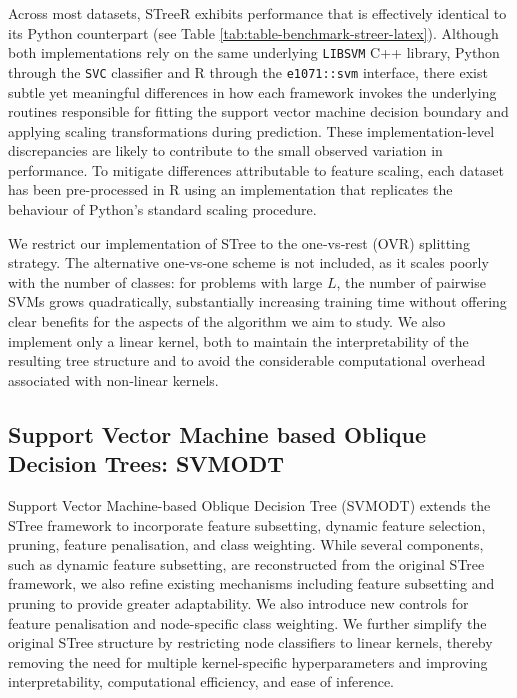 Across most datasets, STreeR exhibits performance that is effectively identical to its Python counterpart (see Table \ref{tab:table-benchmark-streer-latex}). Although both implementations rely on the same underlying \texttt{LIBSVM} C++ library, Python through the \texttt{SVC} classifier and R through the \texttt{e1071::svm} interface, there exist subtle yet meaningful differences in how each framework invokes the underlying routines responsible for fitting the support vector machine decision boundary and applying scaling transformations during prediction. These implementation-level discrepancies are likely to contribute to the small observed variation in performance. To mitigate differences attributable to feature scaling, each dataset has been pre-processed in R using an implementation that replicates the behaviour of Python's standard scaling procedure.

We restrict our implementation of STree to the one‑vs‑rest (OVR) splitting strategy. The alternative one‑vs‑one scheme is not included, as it scales poorly with the number of classes: for problems with large \(L\), the number of pairwise SVMs grows quadratically, substantially increasing training time without offering clear benefits for the aspects of the algorithm we aim to study. We also implement only a linear kernel, both to maintain the interpretability of the resulting tree structure and to avoid the considerable computational overhead associated with non‑linear kernels.

\subsection{Support Vector Machine based Oblique Decision Trees: SVMODT}\label{support-vector-machine-based-oblique-decision-trees-svmodt}

Support Vector Machine-based Oblique Decision Tree (SVMODT) extends the STree framework to incorporate feature subsetting, dynamic feature selection, pruning, feature penalisation, and class weighting. While several components, such as dynamic feature subsetting, are reconstructed from the original STree framework, we also refine existing mechanisms including feature subsetting and pruning to provide greater adaptability. We also introduce new controls for feature penalisation and node-specific class weighting. We further simplify the original STree structure by restricting node classifiers to linear kernels, thereby removing the need for multiple kernel-specific hyperparameters and improving interpretability, computational efficiency, and ease of inference.


